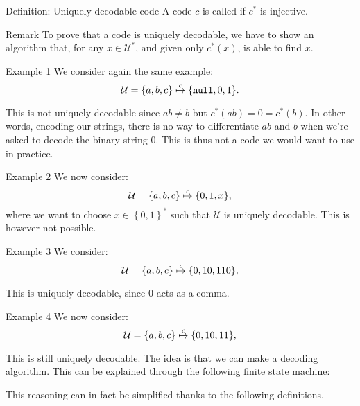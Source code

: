 \documentclass[a4paper]{article}
\begin{document}
\begin{parag}{Definition: Uniquely decodable code}
    A code $c$ is called  if $c^*$ is injective.

    \begin{subparag}{Remark}
        To prove that a code is uniquely decodable, we have to show an algorithm that, for any $x \in \mathcal{U}^*$, and given only $c^*\left(x\right)$, is able to find $x$. 
    \end{subparag}

    \begin{subparag}{Example 1}
        We consider again the same example:
        \[\mathcal{U} = \left\{a, b, c\right\} \over{\mapsto}{$c$}  \left\{\emptystring, 0, 1\right\}.\]

        This is not uniquely decodable since $ab \neq b$ but $c^*\left(ab\right) = 0 = c^*\left(b\right)$. In other words, encoding our strings, there is no way to differentiate $ab$ and $b$ when we're asked to decode the binary string $0$. This is thus not a code we would want to use in practice.
    \end{subparag}

    \begin{subparag}{Example 2}
        We now consider:
        \[\mathcal{U} = \left\{a, b, c\right\} \over{\mapsto}{$c$}  \left\{0, 1, x\right\},\]
        where we want to choose $x \in \left\{0, 1\right\}^*$ such that $\mathcal{U}$ is uniquely decodable. This is however not possible.
    \end{subparag}

    \begin{subparag}{Example 3}
        We consider:
        \[\mathcal{U} = \left\{a, b, c\right\} \over{\mapsto}{$c$}  \left\{0, 10, 110\right\},\]
        
        This is uniquely decodable, since $0$ acts as a comma.
    \end{subparag}

    \begin{subparag}{Example 4}
        We now consider:
        \[\mathcal{U} = \left\{a, b, c\right\} \over{\mapsto}{$c$}  \left\{0, 10, 11\right\},\]
        
        This is still uniquely decodable. The idea is that we can make a decoding algorithm. This can be explained through the following finite state machine:

        This reasoning can in fact be simplified thanks to the following definitions. 
    \end{subparag}
\end{parag}
\end{document}

